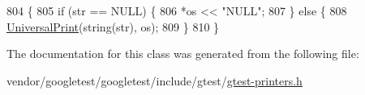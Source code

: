\begin{DoxyCode}
804                                                      \{
805     \textcolor{keywordflow}{if} (str == NULL) \{
806       *os << \textcolor{stringliteral}{"NULL"};
807     \} \textcolor{keywordflow}{else} \{
808       \hyperlink{namespacetesting_1_1internal_ad121a890bddf866e59605d1a0198dada}{UniversalPrint}(\textcolor{keywordtype}{string}(str), os);
809     \}
810   \}
\end{DoxyCode}


The documentation for this class was generated from the following file\+:\begin{DoxyCompactItemize}
\item 
vendor/googletest/googletest/include/gtest/\hyperlink{gtest-printers_8h}{gtest-\/printers.\+h}\end{DoxyCompactItemize}
